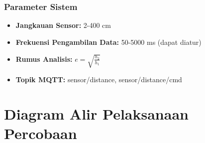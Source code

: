 \subsubsection{Parameter Sistem}
\begin{itemize}
    \item \textbf{Jangkauan Sensor:} 2-400 cm
    \item \textbf{Frekuensi Pengambilan Data:} 50-5000 ms (dapat diatur)
    \item \textbf{Rumus Analisis:} $e = \sqrt{\frac{h_2}{h_1}}$
    \item \textbf{Topik MQTT:} sensor/distance, sensor/distance/cmd
\end{itemize}

\section{Diagram Alir Pelaksanaan Percobaan}

